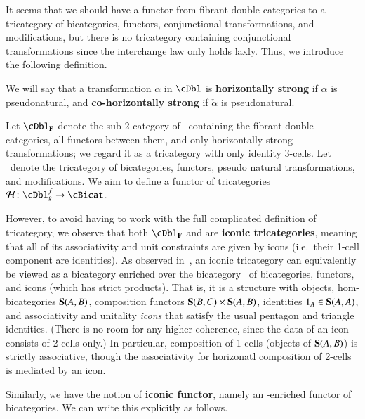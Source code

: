 


It seems that we should have a functor from fibrant double categories
to a tricategory of bicategories, functors, conjunctional
transformations, and modifications, but there is no tricategory
containing conjunctional transformations since the interchange law
only holds laxly.  Thus, we introduce the following definition.

\begin{defn}
  We will say that a transformation $\alpha$ in $\cDbl$ is \textbf{horizontally strong} if $\hat\alpha$ is pseudonatural, and \textbf{co-horizontally strong} if $\check \alpha$ is pseudonatural.
\end{defn}

Let $\cDbl_{\bf F}$
denote the sub-2-category of \cDbl\ containing the fibrant double
categories, all functors between them, and only horizontally-strong transformations; we regard it as a tricategory with only identity 3-cells.
Let \cBicat\ denote the tricategory of
bicategories, functors, pseudo natural transformations, and
modifications.  We aim to define a functor of tricategories $\cH\maps \cDbl^f_g\to \cBicat$.

However, to avoid having to work with the full complicated definition of tricategory, we observe that both $\cDbl_{\bf F}$ and \cBicat are \textbf{iconic tricategories}, meaning that all of its associativity and unit constraints are given by icons (i.e.\ their 1-cell component are identities).
As observed in~\cite{shulman:psalg}, an iconic tricategory can equivalently be viewed as a bicategory enriched over the bicategory \Icon\ of bicategories, functors, and icons (which has strict products).
That is, it is a structure \bS with objects, hom-bicategories $\mathbf{S}(A,B)$, composition functors $\mathbf{S}(B,C)\times \mathbf{S}(A,B)$, identities $1_A \in \mathbf{S}(A,A)$, and associativity and unitality \emph{icons} that satisfy the usual pentagon and triangle identities.
(There is no room for any higher coherence, since the data of an icon consists of 2-cells only.)
In particular, composition of 1-cells (objects of $\mathbf{S}(A,B)$) is strictly associative, though the associativity for horizonatl composition of 2-cells is mediated by an icon.

Similarly, we have the notion of \textbf{iconic functor}, namely an \Icon-enriched functor of bicategories.
We can write this explicitly as follows.

